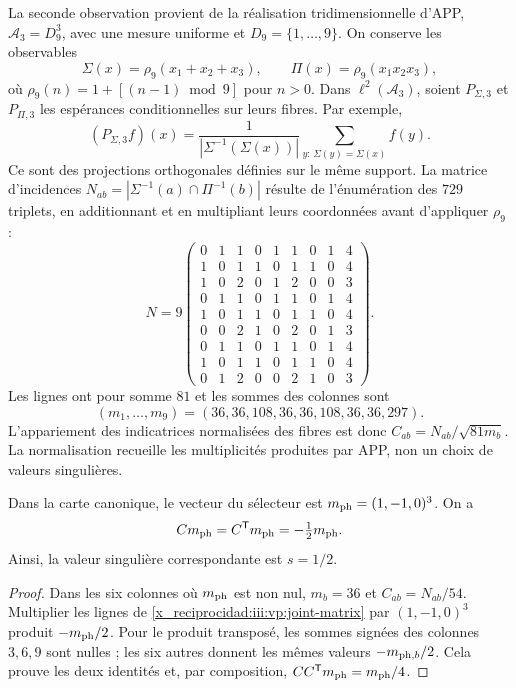 La seconde observation provient de la réalisation tridimensionnelle d’APP,
$\mathcal A_3=D_9^3$, avec une mesure uniforme et
$D_9=\{1,\ldots,9\}$. On conserve les observables
\[
 \Sigma(x)=\rho_9(x_1+x_2+x_3),\qquad
 \Pi(x)=\rho_9(x_1x_2x_3),
\]
où $\rho_9(n)=1+[(n-1)\bmod9]$ pour $n>0$. Dans
$\ell^2(\mathcal A_3)$, soient $P_{\Sigma,3}$ et $P_{\Pi,3}$ les
espérances conditionnelles sur leurs fibres. Par exemple,
\[
 (P_{\Sigma,3}f)(x)=
 \frac1{|\Sigma^{-1}(\Sigma(x))|}
 \sum_{y:\,\Sigma(y)=\Sigma(x)}f(y).
\]
Ce sont des projections orthogonales définies sur le même support. La matrice
d’incidences $N_{ab}=|\Sigma^{-1}(a)\cap\Pi^{-1}(b)|$ résulte de
l’énumération des $729$ triplets, en additionnant et en multipliant leurs coordonnées avant
d’appliquer $\rho_9$ :
\begin{equation}
 N=9\begin{pmatrix}
 0&1&1&0&1&1&0&1&4\\
 1&0&1&1&0&1&1&0&4\\
 1&0&2&0&1&2&0&0&3\\
 0&1&1&0&1&1&0&1&4\\
 1&0&1&1&0&1&1&0&4\\
 0&0&2&1&0&2&0&1&3\\
 0&1&1&0&1&1&0&1&4\\
 1&0&1&1&0&1&1&0&4\\
 0&1&2&0&0&2&1&0&3
 \end{pmatrix}.
 \label{x_reciprocidad:iii:vp:joint-matrix}
\end{equation}
Les lignes ont pour somme $81$ et les sommes des colonnes sont
\[
 (m_1,\ldots,m_9)=(36,36,108,36,36,108,36,36,297).
\]
L’appariement des indicatrices normalisées des fibres
est donc $C_{ab}=N_{ab}/\sqrt{81m_b}$. La normalisation recueille les
multiplicités produites par APP, non un choix de valeurs singulières.

\begin{proposition}
Dans la carte canonique, le vecteur du sélecteur est $m_{\rm ph}=(1,-1,0)^3$. On a
\begin{equation}
 Cm_{\rm ph}=C^{\mathsf T}m_{\rm ph}=-\tfrac12m_{\rm ph}.
 \label{x_reciprocidad:iii:vp:trit-mode}
\end{equation}
Ainsi, la valeur singulière correspondante est $s=1/2$.
\end{proposition}
\begin{proof}
Dans les six colonnes où $m_{\rm ph}$ est non nul, $m_b=36$ et
$C_{ab}=N_{ab}/54$. Multiplier les lignes de
\eqref{x_reciprocidad:iii:vp:joint-matrix} par $(1,-1,0)^3$ produit
$-m_{\rm ph}/2$. Pour le produit transposé, les sommes signées
des colonnes $3,6,9$ sont nulles ; les six autres donnent les mêmes
valeurs $-m_{{\rm ph},b}/2$. Cela prouve les deux identités et, par
composition, $CC^{\mathsf T}m_{\rm ph}=m_{\rm ph}/4$.
\end{proof}

